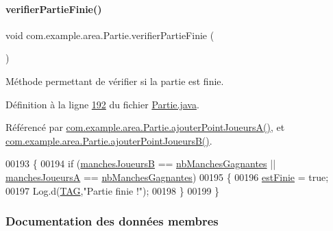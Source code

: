 \paragraph{\texorpdfstring{verifier\+Partie\+Finie()}{verifierPartieFinie()}}
{\footnotesize\ttfamily void com.\+example.\+area.\+Partie.\+verifier\+Partie\+Finie (\begin{DoxyParamCaption}{ }\end{DoxyParamCaption})\hspace{0.3cm}{\ttfamily [private]}}



Méthode permettant de vérifier si la partie est finie. 



Définition à la ligne \hyperlink{_partie_8java_source_l00192}{192} du fichier \hyperlink{_partie_8java_source}{Partie.\+java}.



Référencé par \hyperlink{_partie_8java_source_l00128}{com.\+example.\+area.\+Partie.\+ajouter\+Point\+Joueurs\+A()}, et \hyperlink{_partie_8java_source_l00147}{com.\+example.\+area.\+Partie.\+ajouter\+Point\+Joueurs\+B()}.


\begin{DoxyCode}
00193     \{
00194         \textcolor{keywordflow}{if} (\hyperlink{classcom_1_1example_1_1area_1_1_partie_a9bb9a60be0b966b5a8bd5ac0934387bf}{manchesJoueursB} == \hyperlink{classcom_1_1example_1_1area_1_1_partie_a1d1d6ce602fecf229217fe3d7a4d9152}{nbManchesGagnantes} || 
      \hyperlink{classcom_1_1example_1_1area_1_1_partie_a4563ef3464c670e68405bb7256abb770}{manchesJoueursA} == \hyperlink{classcom_1_1example_1_1area_1_1_partie_a1d1d6ce602fecf229217fe3d7a4d9152}{nbManchesGagnantes})
00195         \{
00196             \hyperlink{classcom_1_1example_1_1area_1_1_partie_ab0dd955a65440cab1569311ff35de3eb}{estFinie} = \textcolor{keyword}{true};
00197             Log.d(\hyperlink{classcom_1_1example_1_1area_1_1_partie_ac0444402f7c570474df1c8b7ece88ad9}{TAG},\textcolor{stringliteral}{"Partie finie !"});
00198         \}
00199     \}
\end{DoxyCode}


\subsubsection{Documentation des données membres}
\mbox{\label{classcom_1_1example_1_1area_1_1_partie_a00890390c78922c024fe31065923964e}} 
